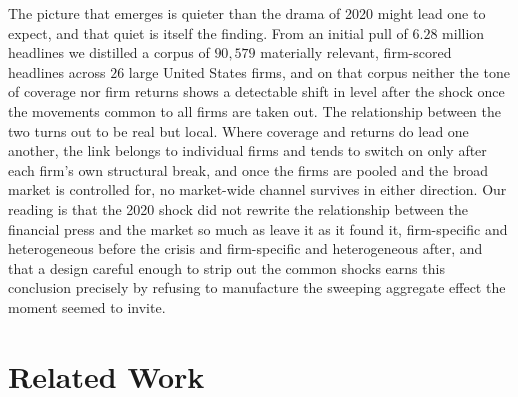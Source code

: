 \documentclass[conference]{IEEEtran}
\begin{document}
The picture that emerges is quieter than the drama of 2020 might lead one to expect, and
that quiet is itself the finding. From an initial pull of $6.28$ million headlines we
distilled a corpus of $90{,}579$ materially relevant, firm-scored headlines across $26$
large United States firms, and on that corpus neither the tone of coverage nor firm
returns shows a detectable shift in level after the shock once the movements common to
all firms are taken out. The relationship between the two turns out to be real but local.
Where coverage and returns do lead one another, the link belongs to individual firms and
tends to switch on only after each firm's own structural break, and once the firms are
pooled and the broad market is controlled for, no market-wide channel survives in either
direction. Our reading is that the 2020 shock did not rewrite the relationship between
the financial press and the market so much as leave it as it found it, firm-specific and
heterogeneous before the crisis and firm-specific and heterogeneous after, and that a
design careful enough to strip out the common shocks earns this conclusion precisely by
refusing to manufacture the sweeping aggregate effect the moment seemed to invite.

\section{Related Work}
\end{document}

